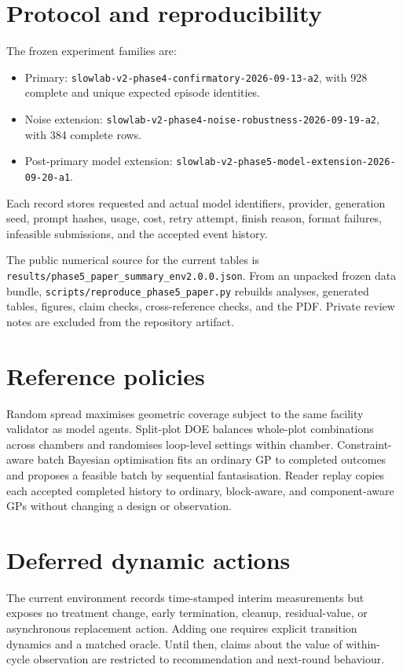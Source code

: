 \section{Protocol and reproducibility}
\label{app:protocol}

The frozen experiment families are:
\begin{itemize}[leftmargin=1.3em,itemsep=0.2em]
\item Primary: \nolinkurl{slowlab-v2-phase4-confirmatory-2026-09-13-a2}, with 928 complete and unique expected episode identities.
\item Noise extension: \nolinkurl{slowlab-v2-phase4-noise-robustness-2026-09-19-a2}, with 384 complete rows.
\item Post-primary model extension: \nolinkurl{slowlab-v2-phase5-model-extension-2026-09-20-a1}.
\end{itemize}
Each record stores requested and actual model identifiers, provider, generation seed, prompt
hashes, usage, cost, retry attempt, finish reason, format failures, infeasible submissions,
and the accepted event history.

The public numerical source for the current tables is
\nolinkurl{results/phase5_paper_summary_env2.0.0.json}. From an unpacked frozen data bundle,
\nolinkurl{scripts/reproduce_phase5_paper.py} rebuilds analyses, generated tables, figures,
claim checks, cross-reference checks, and the PDF. Private review notes are excluded from
the repository artifact.

\section{Reference policies}
Random spread maximises geometric coverage subject to the same facility validator as model
agents. Split-plot DOE balances whole-plot combinations across chambers and randomises
loop-level settings within chamber. Constraint-aware batch Bayesian optimisation fits an
ordinary GP to completed outcomes and proposes a feasible batch by sequential
fantasisation. Reader replay copies each accepted completed history to ordinary,
block-aware, and component-aware GPs without changing a design or observation.

\section{Deferred dynamic actions}
The current environment records time-stamped interim measurements but exposes no treatment
change, early termination, cleanup, residual-value, or asynchronous replacement action.
Adding one requires explicit transition dynamics and a matched oracle. Until then, claims
about the value of within-cycle observation are restricted to recommendation and next-round
behaviour.
